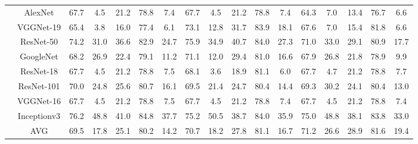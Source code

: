 \documentclass[12pt,italian]{article}
\begin{document}
\begin{tiny}
\begin{longtable}{lcccccccccccccccc}
& AlexNet & 67.7 &  4.5 & 21.2 & 78.8 &  7.4 & 67.7 &  4.5 & 21.2 & 78.8 &  7.4 & 64.3 &  7.0 & 13.4 & 76.7 &  6.6 \\ 
& VGGNet-19 & 65.4 &  3.8 & 16.0 & 77.4 &  6.1 & 73.1 & 12.8 & 31.7 & 83.9 & 18.1 & 67.6 &  7.0 & 15.4 & 81.8 &  6.6 \\ 
& ResNet-50 & 74.2 & 31.0 & 36.6 & 82.9 & 24.7 & 75.9 & 34.9 & 40.7 & 84.0 & 27.3 & 71.0 & 33.0 & 29.1 & 80.9 & 17.7 \\ 
& GoogleNet & 68.2 & 26.9 & 22.4 & 79.1 & 11.2 & 71.1 & 12.0 & 29.4 & 81.0 & 16.6 & 67.9 & 26.8 & 21.8 & 78.9 &  9.9 \\ 
& ResNet-18 & 67.7 &  4.5 & 21.2 & 78.8 &  7.5 & 68.1 &  3.6 & 18.9 & 81.1 &  6.0 & 67.7 &  4.7 & 21.2 & 78.8 &  7.7 \\ 
& ResNet-101 & 70.0 & 24.8 & 25.6 & 80.7 & 16.1 & 69.5 & 21.4 & 24.7 & 80.4 & 14.4 & 69.3 & 30.2 & 24.1 & 80.4 & 13.0 \\ 
& VGGNet-16 & 67.7 &  4.5 & 21.2 & 78.8 &  7.5 & 67.7 &  4.5 & 21.2 & 78.8 &  7.4 & 67.7 &  4.5 & 21.2 & 78.8 &  7.4 \\ 
& Inceptionv3 & 76.2 & 48.8 & 41.0 & 84.8 & 37.7 & 75.2 & 50.5 & 38.7 & 84.0 & 35.9 & 75.0 & 48.8 & 38.1 & 83.8 & 33.0 \\ 
\hline
& AVG & 69.5 & 17.8 & 25.1 & 80.2 & 14.2 & 70.7 & 18.2 & 27.8 & 81.1 & 16.7 & 71.2 & 26.6 & 28.9 & 81.6 & 19.4 \\ 
\hline
\bottomrule
\end{longtable} 

 \pagebreak 
\end{tiny} 
 
\end{document}
